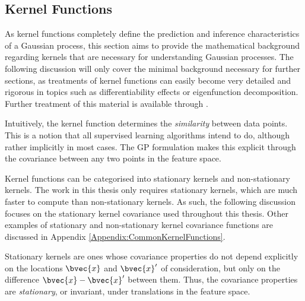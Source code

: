 		\subsection{Kernel Functions}
		\label{Background:GaussianProcesses:KernelFunctions}

			As kernel functions completely define the prediction and inference characteristics of a Gaussian process, this section aims to provide the mathematical background regarding kernels that are necessary for understanding Gaussian processes. The following discussion will only cover the minimal background necessary for further sections, as treatments of kernel functions can easily become very detailed and rigorous in topics such as differentiability effects or eigenfunction decomposition. Further treatment of this material is available through \cite{GaussianProcessForMachineLearning}. 
			
			Intuitively, the kernel function determines the \textit{similarity} between data points. This is a notion that all supervised learning algorithms intend to do, although rather implicitly in most cases. The GP formulation makes this explicit through the covariance between any two points in the feature space.
			
			Kernel functions can be categorised into stationary kernels and non-stationary kernels. The work in this thesis only requires stationary kernels, which are much faster to compute than non-stationary kernels. As such, the following discussion focuses on the stationary kernel covariance used throughout this thesis. Other examples of stationary and non-stationary kernel covariance functions are discussed in Appendix \ref{Appendix:CommonKernelFunctions}.
			
			Stationary kernels are ones whose covariance properties do not depend explicitly on the locations $\bvec{x}$ and $\bvec{x}'$ of consideration, but only on the difference $\bvec{x} - \bvec{x}'$ between them. Thus, the covariance properties are \textit{stationary}, or invariant, under translations in the feature space.
			
